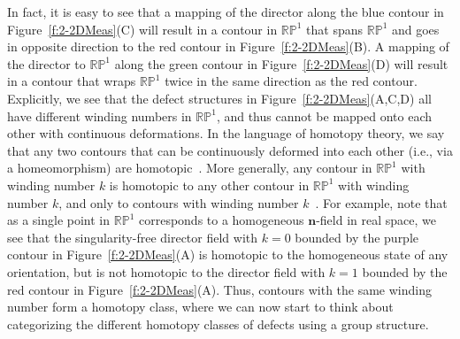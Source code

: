 In fact, it is easy to see that a mapping of the director along the blue contour in Figure~\ref{f:2-2DMeas}(C) will result in a contour in $\mathbb{R}\mathbb{P}^1$ that spans $\mathbb{RP}^1$ and goes in opposite direction to the red contour in  Figure~\ref{f:2-2DMeas}(B).
A mapping of the director to $\mathbb{R}\mathbb{P}^1$ along the green contour in Figure~\ref{f:2-2DMeas}(D) will result in a contour that wraps $\mathbb{R}\mathbb{P}^1$ twice in the same direction as the red contour.
Explicitly, we see that the defect structures in Figure~\ref{f:2-2DMeas}(A,C,D) all have different winding numbers in $\mathbb{R}\mathbb{P}^1$, and thus cannot be mapped onto each other with continuous deformations.
In the language of homotopy theory, we say that any two contours that can be continuously deformed into each other (i.e., via a homeomorphism) are homotopic~\cite{RN196}.
More generally, any contour in $\mathbb{R}\mathbb{P}^1$ with winding number $k$ is homotopic to any other contour in $\mathbb{R}\mathbb{P}^1$ with winding number $k$, and only to contours with winding number $k$~\cite{RN196,RN153,RN236}.
For example, note that as a single point in $\mathbb{R}\mathbb{P}^1$ corresponds to a homogeneous $\mathbf{n}$-field in real space, we see that the singularity-free director field with $k=0$ bounded by the purple contour in Figure~\ref{f:2-2DMeas}(A) is homotopic to the homogeneous state of any orientation, but is not homotopic to the director field with $k=1$ bounded by the red contour in Figure~\ref{f:2-2DMeas}(A).
Thus, contours with the same winding number form a homotopy class, where we can now start to think about categorizing the different homotopy classes of defects using a group structure.

